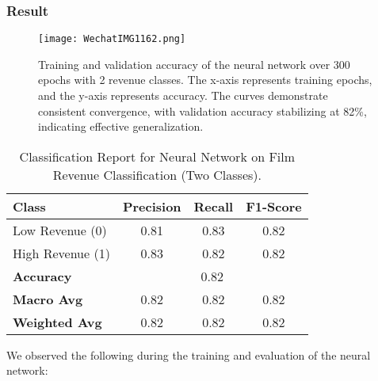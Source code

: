 \documentclass{article}
\begin{document}
\subsubsection{Result}
\begin{figure}[H] %
    \centering
    \vspace{0.3cm} %
    \texttt{[image: WechatIMG1162.png]} %
    \caption{Training and validation accuracy of the neural network over 300 epochs with 2 revenue classes. The x-axis represents training epochs, and the y-axis represents accuracy. The curves demonstrate consistent convergence, with validation accuracy stabilizing at 82\%, indicating effective generalization.}
    \label{fig:training_validation_accuracy}
\end{figure}

\begin{table}[H]
    \centering
    \small %
    \caption{Classification Report for Neural Network on Film Revenue Classification (Two Classes).}
    \label{tab:classification_report}
    \vspace{0.1in} %
    \begin{tabular}{lccc}
        \toprule
        \textbf{Class} & \textbf{Precision} & \textbf{Recall} & \textbf{F1-Score} \\
        \midrule
        Low Revenue (0)  & 0.81 & 0.83 & 0.82 \\
        High Revenue (1) & 0.83 & 0.82 & 0.82 \\
        \midrule
        \textbf{Accuracy}  & \multicolumn{3}{c}{0.82} \\
        \textbf{Macro Avg} & 0.82 & 0.82 & 0.82 \\
        \textbf{Weighted Avg} & 0.82 & 0.82 & 0.82 \\
        \bottomrule
    \end{tabular}
    \vspace{0.1in} %
\end{table}

We observed the following during the training and evaluation of the neural network:
\end{document}

